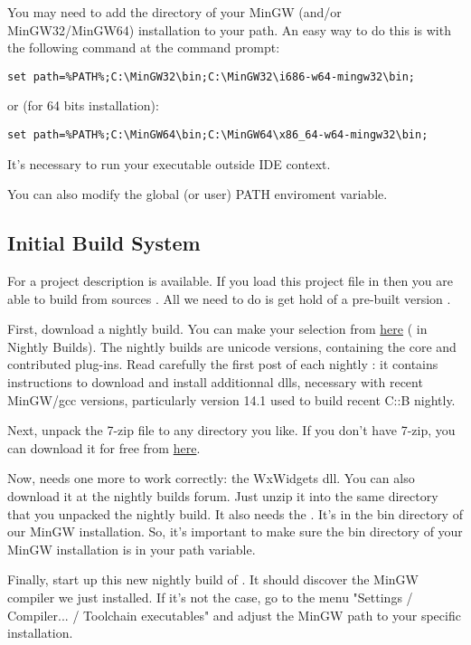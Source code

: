 You may need to add the  directory of your MinGW (and/or MinGW32/MinGW64) installation to your path. An easy way to do this is with the following command at the command prompt:

\begin{verbatim}
set path=%PATH%;C:\MinGW32\bin;C:\MinGW32\i686-w64-mingw32\bin;
\end{verbatim}
or (for 64 bits installation):
\begin{verbatim}
set path=%PATH%;C:\MinGW64\bin;C:\MinGW64\x86_64-w64-mingw32\bin;
\end{verbatim}

It's necessary to run your executable outside \codeblocks IDE context.

You can also modify the global (or user) PATH enviroment variable.


\subsection{Initial Build System}

For \href{https://www.codeblocks.org/}{\codeblocks} a project description  is available. If you load this project file in \codeblocks then you are able to build \codeblocks from sources \cite{url:cb}. All we need to do is get hold of a pre-built version \codeblocks.

First, download a nightly build. You can make your selection from \href{https://forums.codeblocks.org/}{here} (\cite{url:cbforum} in Nightly Builds). The nightly builds are unicode versions, containing the core and contributed plug-ins. Read carefully the first post of each nightly : it contains instructions to download and install additionnal dlls, necessary with recent MinGW/gcc versions, particularly version 14.1 used to build recent C::B nightly.

Next, unpack the 7-zip file \cite{url:zip} to any directory you like. If you don't have 7-zip, you can download it for free from \href{https://www.7-zip.org}{here}.

Now, \codeblocks needs one more  to work correctly: the WxWidgets dll. You can also download it at the nightly builds forum. Just unzip it into the same directory that you unpacked the \codeblocks nightly build. It also needs the . It's in the bin directory of our MinGW installation. So, it's important to make sure the bin directory of your MinGW installation is in your path variable.

Finally, start up this new nightly build of \codeblocks. It should discover the MinGW compiler we just installed. If it's not the case, go to the menu "Settings / Compiler... / Toolchain executables" and adjust the MinGW path to your specific installation.

